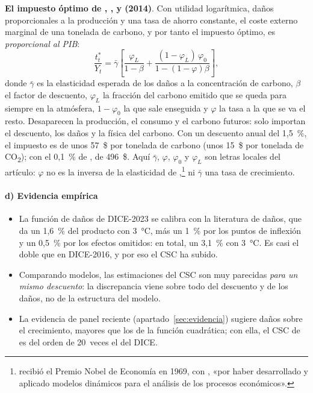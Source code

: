 \documentclass[11pt]{article}
\begin{document}
\begin{anotaciones}
\textbf{El impuesto óptimo de , ,  y  (2014)}. Con utilidad logarítmica, daños proporcionales a la producción y una tasa de ahorro constante, el coste externo marginal de una tonelada de carbono, y por tanto el impuesto óptimo, es \emph{proporcional al PIB}:
\[
\frac{t^*_t}{Y_t}=\bar\gamma\left[\frac{\varphi_L}{1-\beta}+\frac{(1-\varphi_L)\,\varphi_0}{1-(1-\varphi)\beta}\right],
\]
donde $\bar\gamma$ es la elasticidad esperada de los daños a la concentración de carbono, $\beta$ el factor de descuento, $\varphi_L$ la fracción del carbono emitido que se queda para siempre en la atmósfera, $1-\varphi_0$ la que sale enseguida y $\varphi$ la tasa a la que se va el resto. Desaparecen la producción, el consumo y el carbono futuros: solo importan el descuento, los daños y la física del carbono. Con un descuento anual del 1,5~\%, el impuesto es de unos 57~\$ por tonelada de carbono (unos 15~\$ por tonelada de CO\textsubscript{2}); con el 0,1~\% de , de 496~\$\nocite{Golosov2014Optimal}. Aquí $\bar\gamma$, $\varphi$, $\varphi_0$ y $\varphi_L$ son letras locales del artículo: $\varphi$ no es la inversa de la elasticidad de ,\footnote{ recibió el Premio Nobel de Economía en 1969, con , «por haber desarrollado y aplicado modelos dinámicos para el análisis de los procesos económicos»\nocite{Nobel1969}.} ni $\bar\gamma$ una tasa de crecimiento.
\end{anotaciones}

\paragraph{d) Evidencia empírica}

\begin{itemize}
\item La función de daños de DICE-2023 se calibra con la literatura de daños, que da un 1,6~\% del producto con 3~°C, más un 1~\% por los puntos de inflexión y un 0,5~\% por los efectos omitidos: en total, un 3,1~\% con 3~°C. Es casi el doble que en DICE-2016, y por eso el CSC ha subido\nocite{BarrageNordhaus2024DICE}.
\item Comparando modelos, las estimaciones del CSC son muy parecidas \emph{para un mismo descuento}: la discrepancia viene sobre todo del descuento y de los daños, no de la estructura del modelo\nocite{BarrageNordhaus2024DICE}.
\item La evidencia de panel reciente (apartado~\ref{sec:evidencia}) sugiere daños sobre el crecimiento, mayores que los de la función cuadrática; con ella, el CSC de \textcite{BilalKanzig2026Macroeconomic} es del orden de 20~veces el del DICE.
\end{itemize}
\end{document}
